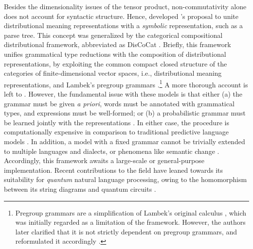 Besides the dimensionality issues of the tensor product, non-commutativity alone does
not account for syntactic structure.
Hence, \textcites[3-4]{Clark2007} developed \citeauthor{Smolensky1990}'s proposal to
unite distributional meaning representations with a \emph{symbolic} representation,
such as a parse tree.
This concept was generalized by the categorical compositional distributional framework,
abbreviated as DisCoCat \parencites{Clark2008}{Coecke2010}.
Briefly, this framework unifies grammatical type reductions with the composition of
distributional representations, by exploiting the common compact closed structure of
the categories of finite-dimensional vector spaces, i.e., distributional meaning
representations, and Lambek's pregroup grammars
\parencites*{Lambek1999}.\footnote{Pregroup grammars are a simplification of Lambek's
  original calculus \parencites*{Lambek1958}, which was initially regarded as a
  limitation of the framework.
  However, the authors later clarified that it is not strictly dependent on pregroup
  grammars, and reformulated it accordingly \parencites{Coecke2013a}.
}
A more thorough account is left to
\textcites[29-44]{Grefenstette2013}[27-38]{Kartsaklis2015}.
However, the fundamental issue with these models is that either (a) the grammar must be
given \emph{a priori}, words must be annotated with grammatical types, and expressions
must be well-formed; or (b) a probabilistic grammar must be learned jointly with the
representations \parencites{Toumi2021}.
In either case, the procedure is computationally expensive in comparison to traditional
predictive language models \parencites[e.g.][5]{Meichanetzidis2023}.
In addition, a model with a fixed grammar cannot be trivially extended to multiple
languages and dialects, or phenomena like semantic change
\parencites[cf.][]{Bradley2018}.
Accordingly, this framework awaits a large-scale or general-purpose implementation.
Recent contributions to the field have leaned towards its suitability for
\emph{quantum} natural language processing, owing to the homomorphism between its
string diagrams and quantum circuits \parencites[e.g.][]{deFelice2021a}.

